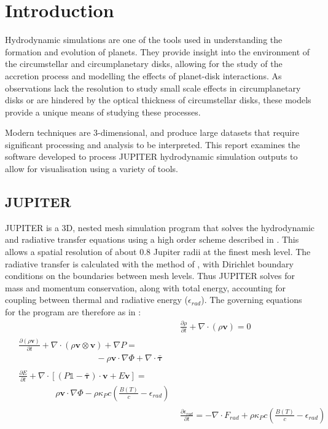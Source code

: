 \documentclass[preprint2]{aastex62}
\begin{document}
\section{Introduction}\label{sec:intro}
Hydrodynamic simulations are one of the tools used in understanding the formation and evolution of planets. 
They provide insight into the environment of the circumstellar and circumplanetary disks, allowing for the study of the accretion process and modelling the effects of planet-disk interactions.
As observations lack the resolution to study small scale effects in circumplanetary disks or are hindered by the optical thickness of circumstellar disks, these models provide a unique means of studying these processes. 

Modern techniques are 3-dimensional, and produce large datasets that require significant processing and analysis to be interpreted.
This report examines the software developed to process JUPITER hydrodynamic simulation outputs to allow for visualisation using a variety of tools.
\subsection{JUPITER}\label{sec:jup}
JUPITER is a 3D, nested mesh simulation program that solves the hydrodynamic and radiative transfer equations using a high order \cite{MR0119433} scheme described in \cite{Szulagyi2016,Szulagyi2014,DeVal-Borro2006}. 
This allows a spatial resolution of about 0.8 Jupiter radii at the finest mesh level. 
The radiative transfer is calculated with the method of \cite{comm2011}, with Dirichlet boundary conditions on the boundaries between mesh levels.
Thus JUPITER solves for mass and momentum conservation, along with total energy, accounting for coupling between thermal and radiative energy ($\epsilon_{rad}$). The governing equations for the program are therefore as in \cite{Szulagyi2016}:
\begin{align}\label{eqns:hydro}
&\frac{\partial\rho}{\partial t} + \nabla \cdot \left(\rho\mathbf{v}\right) = 0\\
\begin{split}
&\frac{\partial\left(\rho\mathbf{v}\right)}{\partial t} + \nabla \cdot \left(\rho\mathbf{v} \otimes \mathbf{v}\right) + \nabla P = \\&\qquad\qquad\qquad\quad\quad\quad-\rho\mathbf{v}\cdot\nabla\Phi + \nabla \cdot \bm{\bar{\tau}}
\end{split}\\
\begin{split}
&\frac{\partial E}{\partial t} + \nabla\cdot\left[\left(P \mathds{1}- \bm{\bar{\tau}} \right) \cdot \mathbf{v} + E\mathbf{v}\right] = \\&\qquad\qquad\;\rho \mathbf{v}\cdot\nabla\Phi - \rho\kappa_{P}c\left(\frac{B\left(T\right)}{c} - \epsilon_{rad}\right)
\end{split}\\
&\frac{\partial \epsilon_{rad}}{\partial t} = -\nabla \cdot F_{rad} + \rho\kappa_{P}c\left(\frac{B\left(T\right)}{c} - \epsilon_{rad}\right)
\end{align}
\end{document}
